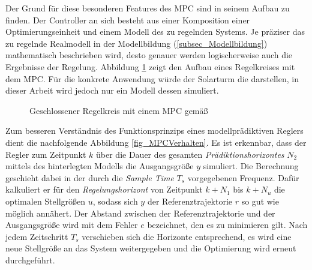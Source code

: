 Der Grund für diese besonderen Features des MPC sind in seinem Aufbau zu finden.
Der Controller an sich besteht aus einer Komposition einer Optimierungseinheit und einem Modell des zu regelnden Systems.
Je präziser das zu regelnde Realmodell in der Modellbildung (\ref{subsec_Modellbildung}) mathematisch beschrieben wird, desto genauer werden logischerweise auch die Ergebnisse der Regelung.
Abbildung \ref{fig_RegelkreisMPC} zeigt den Aufbau eines Regelkreises mit dem MPC.
Für die konkrete Anwendung würde der Solarturm die  darstellen, in dieser Arbeit wird jedoch nur ein Modell dessen simuliert.

\begin{figure}[h!]
    \centering
    \setlength{\fboxsep}{1pt}
    \setlength{\fboxrule}{1pt}
\caption[Geschlossener Regelkreis mit einem MPC]{Geschlossener Regelkreis mit einem MPC gemäß\cite[S. 2]{Schwenzer}}
    \label{fig_RegelkreisMPC}
\end{figure}

Zum besseren Verständnis des Funktionsprinzips eines modellprädiktiven Reglers dient die nachfolgende Abbildung \ref{fig_MPCVerhalten}.
Es ist erkennbar, dass der Regler zum Zeitpunkt $k$ über die Dauer des gesamten \textit{Prädiktionshorizontes} $N_2$ mittels des hinterlegten Modells die Ausgangsgröße $y$ simuliert.
Die Berechnung geschieht dabei in der durch die \textit{Sample Time} $T_s$ vorgegebenen Frequenz.
Dafür kalkuliert er für den \textit{Regelungshorizont} von Zeitpunkt $k+N_1$ bis $k+N_u$ die optimalen Stellgrößen $u$, sodass sich $y$ der Referenztrajektorie $r$ so gut wie möglich annähert.
Der Abstand zwischen der Referenztrajektorie und der Ausgangsgröße wird mit dem Fehler $e$ bezeichnet, den es zu minimieren gilt.
Nach jedem Zeitschritt $T_s$ verschieben sich die Horizonte entsprechend, es wird eine neue Stellgröße an das System weitergegeben und die Optimierung wird erneut durchgeführt. \cite[S. 3]{Schwenzer}

